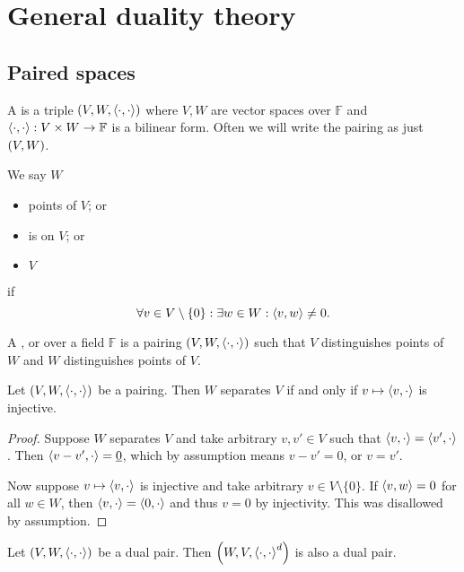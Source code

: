 \chapter{General duality theory}
\section{Paired spaces}
\begin{definition}
A  is a triple $\sSet{V,W, \pair{\cdot,\cdot}}$ where $V,W$ are vector spaces over $\mathbb{F}$ and $\left\langle \cdot,\cdot \right\rangle: V\times W\to \mathbb{F}$ is a bilinear form. Often we will write the pairing as just $\sSet{V,W}$.

We say $W$
\begin{itemize}
\item {} points of $V$; or
\item is  on $V$; or
\item {} $V$
\end{itemize}
if 
\[ \forall v\in V\setminus\{0\}: \exists w\in W: \left\langle v,w \right\rangle \neq 0. \]

A ,  or  over a field $\mathbb{F}$ is a pairing $\sSet{V,W,\pair{\cdot,\cdot}}$ such that $V$ distinguishes points of $W$ and $W$ distinguishes points of $V$.
\end{definition}

\begin{lemma} \label{dualSystemInjective}
Let $\sSet{V,W, \pair{\cdot,\cdot}}$ be a pairing. Then $W$ separates $V$ \textup{if and only if} $v\mapsto \left\langle v, \cdot \right\rangle$ is injective.
\end{lemma}
\begin{proof}
Suppose $W$ separates $V$ and take arbitrary $v,v'\in V$ such that $\left\langle v, \cdot \right\rangle = \left\langle v', \cdot \right\rangle$. Then $\left\langle v-v',\cdot \right\rangle = \underline{0}$, which by assumption means $v-v' = 0$, or $v= v'$.

Now suppose $v\mapsto \left\langle v, \cdot \right\rangle$ is injective and take arbitrary $v\in V\setminus\{0\}$. If $\left\langle v,w \right\rangle = 0$ for all $w\in W$, then $\left\langle v,\cdot \right\rangle = \left\langle 0,\cdot \right\rangle$ and thus $v=0$ by injectivity. This was disallowed by assumption.
\end{proof}

\begin{lemma}
Let $\sSet{V,W,\pair{\cdot,\cdot}}$ be a dual pair. Then $\sSet{W,V,\pair{\cdot,\cdot}^d}$ is also a dual pair.
\end{lemma}

